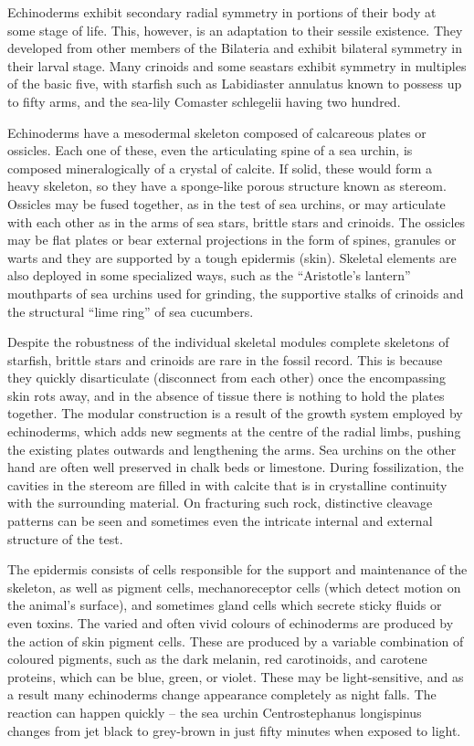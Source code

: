 Echinoderms exhibit secondary radial symmetry in portions of their body at some stage of life. This, however, is an adaptation to their sessile existence. They developed from other members of the Bilateria and exhibit bilateral symmetry in their larval stage. Many crinoids and some seastars exhibit symmetry in multiples of the basic five, with starfish such as Labidiaster annulatus known to possess up to fifty arms, and the sea-lily Comaster schlegelii having two hundred.

Echinoderms have a mesodermal skeleton composed of calcareous plates or ossicles. Each one of these, even the articulating spine of a sea urchin, is composed mineralogically of a crystal of calcite. If solid, these would form a heavy skeleton, so they have a sponge-like porous structure known as stereom. Ossicles may be fused together, as in the test of sea urchins, or may articulate with each other as in the arms of sea stars, brittle stars and crinoids. The ossicles may be flat plates or bear external projections in the form of spines, granules or warts and they are supported by a tough epidermis (skin). Skeletal elements are also deployed in some specialized ways, such as the ``Aristotle's lantern'' mouthparts of sea urchins used for grinding, the supportive stalks of crinoids and the structural ``lime ring'' of sea cucumbers.

Despite the robustness of the individual skeletal modules complete skeletons of starfish, brittle stars and crinoids are rare in the fossil record. This is because they quickly disarticulate (disconnect from each other) once the encompassing skin rots away, and in the absence of tissue there is nothing to hold the plates together. The modular construction is a result of the growth system employed by echinoderms, which adds new segments at the centre of the radial limbs, pushing the existing plates outwards and lengthening the arms. Sea urchins on the other hand are often well preserved in chalk beds or limestone. During fossilization, the cavities in the stereom are filled in with calcite that is in crystalline continuity with the surrounding material. On fracturing such rock, distinctive cleavage patterns can be seen and sometimes even the intricate internal and external structure of the test.

The epidermis consists of cells responsible for the support and maintenance of the skeleton, as well as pigment cells, mechanoreceptor cells (which detect motion on the animal's surface), and sometimes gland cells which secrete sticky fluids or even toxins. The varied and often vivid colours of echinoderms are produced by the action of skin pigment cells. These are produced by a variable combination of coloured pigments, such as the dark melanin, red carotinoids, and carotene proteins, which can be blue, green, or violet. These may be light-sensitive, and as a result many echinoderms change appearance completely as night falls. The reaction can happen quickly -- the sea urchin Centrostephanus longispinus changes from jet black to grey-brown in just fifty minutes when exposed to light.

